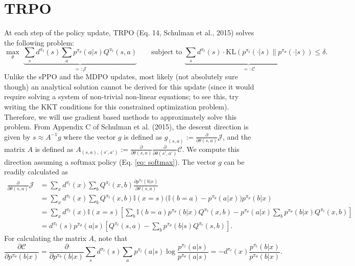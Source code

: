 \documentclass[a4paper, 10pt]{article}
\begin{document}
\section{TRPO}
At each step of the policy update, TRPO (Eq. 14, Schulman et al., 2015) solves the following problem:
\begin{equation}
  \max_\theta \; \underbrace{\sum_s d^{\pi_t}(s) \sum_a p^{\pi_\theta}(a | s) Q^{\pi_t}(s, a)}_{=: \mathcal{J}} \qquad \text{subject to } \underbrace{\sum_s d^{\pi_t}(s) \cdot \text{KL}(p^{\pi_t}(\cdot | s) \| p^{\pi_\theta}(\cdot | s))}_{=: \mathcal{C}} \leq \delta.  
\end{equation}
Unlike the sPPO and the MDPO updates, most likely (not absolutely sure though) an analytical solution cannot be derived for this update (since it would require solving a system of non-trivial non-linear equations; to see this, try writing the KKT conditions for this constrained optimization problem). Therefore, we will use gradient based methods to approximately solve this problem. From Appendix C of Schulman et al. (2015), the descent direction is given by $s \approx A^{-1} g$ where the vector $g$ is defined as $g_{(s, a)} := \frac{\partial}{\partial \theta(s, a)} \mathcal{J}$, and the matrix $A$ is defined as $A_{(s, a), (s', a')} := \frac{\partial}{\partial \theta(s, a)} \frac{\partial}{\partial \theta(s', a')} \mathcal{C}$. We compute this direction assuming a softmax policy (Eq. \ref{eq: softmax}). The vector $g$ can be readily calculated as
\begin{align}
  \frac{\partial}{\partial \theta(s, a)} \mathcal{J} &= \sum_x d^{\pi_t}(x) \sum_b Q^{\pi_t}(x, b) \frac{\partial p^{\pi_\theta}(b | x)}{\partial \theta(s, a)} \nonumber \\
  &= \sum_x d^{\pi_t}(x) \sum_b Q^{\pi_t}(x, b) \mathbb{I}(x = s) \Big( \mathbb{I}(b = a) - p^{\pi_\theta}(a | x) \Big) p^{\pi_\theta}(b | x) \nonumber \\
  &= \sum_x d^{\pi_t}(x) \mathbb{I}(x = s) \left[ \sum_b \mathbb{I}(b = a) p^{\pi_\theta}(b | x) Q^{\pi_t}(x, b) - p^{\pi_\theta}(a | x) \sum_b p^{\pi_\theta}(b | x) Q^{\pi_t}(x, b) \right] \nonumber \\
  &= d^{\pi_t}(s) p^{\pi_\theta}(a | s) \left[ Q^{\pi_t}(s, a) - \sum_b p^{\pi_\theta}(b | s) Q^{\pi_t}(s, b) \right]. \label{eq: trpo_gradient}
\end{align}
For calculating the matrix $A$, note that
\begin{equation*}
  \frac{\partial \mathcal{C}}{\partial p^{\pi_\theta}(b | x)} = \frac{\partial}{\partial p^{\pi_\theta}(b | x)} \sum_s d^{\pi_t}(s) \sum_a p^{\pi_t}(a | s) \log \frac{p^{\pi_t}(a | s)}{p^{\pi_\theta}(a | s)} = - d^{\pi_t}(x) \frac{p^{\pi_t}(b | x)}{p^{\pi_\theta}(b | x)}.
\end{equation*}
\end{document}
